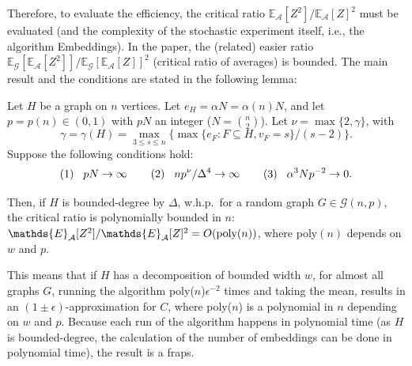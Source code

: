 \documentclass[a4paper,english,12pt,]{scrartcl}
\begin{document}
Therefore, to evaluate the efficiency, the critical ratio $\mathds{E}_\mathcal{A}[Z^2]/\mathds{E}_\mathcal{A}[Z]^2$ must be evaluated (and the complexity of the stochastic experiment itself, i.e., the algorithm Embeddings). 
In the paper, the (related) easier ratio $\mathds{E}_\mathcal{G}[\mathds{E}_\mathcal{A}[Z^2]]/\mathds{E}_\mathcal{G}[\mathds{E}_\mathcal{A}[Z]]^2$ (critical ratio of averages) is bounded. The main result and the conditions are stated in the following lemma:
% 
\begin{lemma} \label{main}
 Let $H$ be a graph on $n$ vertices. Let $e_H=\alpha N = \alpha(n)N$, and let $p=p(n)\in(0,1)$ with $pN$ an integer ($N=\binom{n}{2}$). Let $\nu = \max{\{2,\gamma\}}$, with 
\[
\gamma = \gamma(H) = \max_{3\leq s \leq n} \{ \max{\{ e_F: F \subseteq H, v_F = s}\}/(s-2)\}.                                                                                                                                                       
\]
Suppose the following conditions hold: \begin{equation*} \textnormal{(1)}\hspace{0.3cm}pN \rightarrow \infty \hspace{0.75cm} \textnormal{(2)}\hspace{0.3cm} np^\nu/\Delta^4 \rightarrow \infty \hspace{0.75cm} \textnormal{(3)}\hspace{0.3cm} \alpha^3Np^{-2} \rightarrow 0. \end{equation*}

Then, if $H$ is bounded-degree by $\Delta$, w.h.p.~for a random graph $G\in \mathcal{G}(n,p)$, the critical ratio is polynomially bounded in $n$: $\mathds{E}_\mathcal{A}[Z^2]/\mathds{E}_\mathcal{A}[Z]^2 = O(\textnormal{poly}(n))$, where poly$(n)$ depends on $w$ and $p$.
\end{lemma}

This means that if $H$ has a decomposition of bounded width $w$, for almost all graphs $G$, running the algorithm poly($n$)$\epsilon^{-2}$ times and taking the mean, results in an $(1\pm\epsilon)$-approximation for $C$, where poly($n$) is a polynomial in $n$ depending on $w$ and $p$. Because each run of the algorithm happens in polynomial time (as $H$ is bounded-degree, the calculation of the number of embeddings can be done in polynomial time), the result is a fraps.
\end{document}
